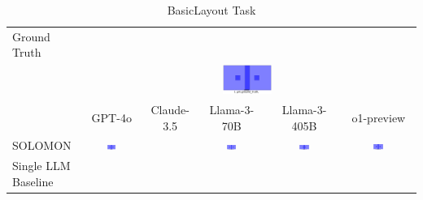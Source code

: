 \begin{table}
  \caption{BasicLayout Task}
  \label{table:basiclayout}
  \centering
  \begin{tabular}{@{}lccccc@{}}
    \toprule
    Ground Truth \\
    & \multicolumn{5}{c}{\includegraphics[width=0.15\textwidth]{examples_png/BasicLayout.png}} \\
    & GPT-4o & Claude-3.5 & Llama-3-70B & Llama-3-405B & o1-preview \\
    \midrule
    SOLOMON & \includegraphics[width=0.15\textwidth]{./pool_all/png/gpt-4o_results/BasicLayout.png} &  & \includegraphics[width=0.15\textwidth]{./pool_all/png/claude-3-5-sonnet-20240620_results/BasicLayout.png} & \includegraphics[width=0.15\textwidth]{./pool_all/png/watsonx_meta-llama_llama-3-1-70b-instruct_results/BasicLayout.png} & \includegraphics[width=0.15\textwidth]{./pool_all/png/watsonx_meta-llama_llama-3-405b-instruct_results/BasicLayout.png} \\
    Single LLM Baseline \\

\end{tabular}
\end{table}
